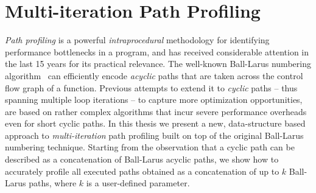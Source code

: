 \section{Multi-iteration Path Profiling}

{\em Path profiling} is a powerful {\em intraprocedural} methodology for identifying performance bottlenecks in a program, and has received considerable attention in the last 15 years for its practical relevance. The well-known Ball-Larus numbering algorithm~\cite{Ball96} can efficiently encode {\em acyclic} paths that are taken across the control flow graph of a function. Previous attempts to extend it to {\em cyclic} paths -- thus spanning multiple loop iterations -- to capture more optimization opportunities, are based on rather complex algorithms that incur severe performance overheads even for short cyclic paths. In this thesis we present a new, data-structure based approach to {\em multi-iteration} path profiling built on top of the original Ball-Larus numbering technique. Starting from the observation that a cyclic path can be described as a concatenation of Ball-Larus acyclic paths, we show how to accurately profile all executed paths obtained as a concatenation of up to $k$ Ball-Larus paths, where $k$ is a user-defined parameter.



